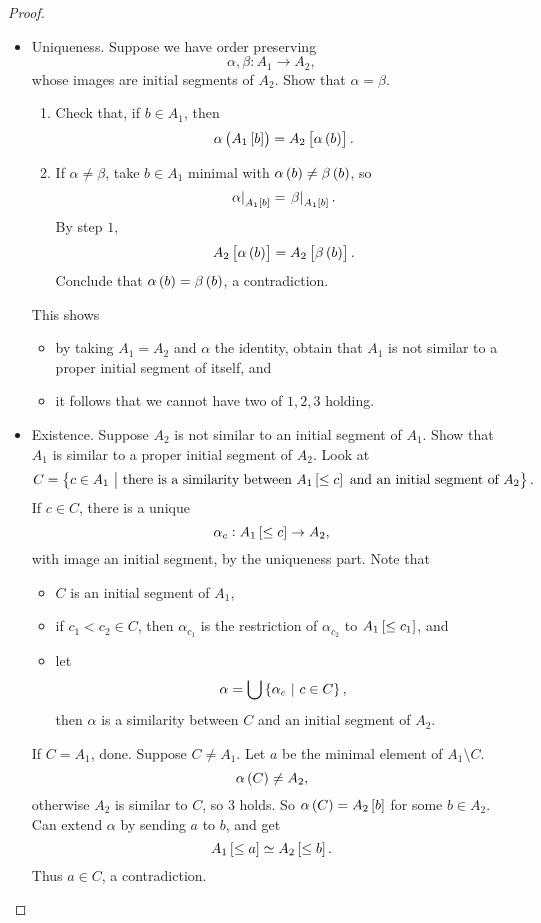 \begin{proof}
\hfill
\begin{itemize}
\item Uniqueness. Suppose we have order preserving
$$ \alpha, \beta : A_1 \to A_2, $$
whose images are initial segments of $ A_2 $. Show that $ \alpha = \beta $.
\begin{enumerate}[leftmargin=0.5in, label=Step \arabic*.]
\item Check that, if $ b \in A_1 $, then
$$ \alpha\br{A_1\sbr{b}} = A_2\sbr{\alpha\br{b}}. $$
\item If $ \alpha \ne \beta $, take $ b \in A_1 $ minimal with $ \alpha\br{b} \ne \beta\br{b} $, so
$$ \eval{\alpha}_{A_1\sbr{b}} = \eval{\beta}_{A_1\sbr{b}}. $$
By step $ 1 $,
$$ A_2\sbr{\alpha\br{b}} = A_2\sbr{\beta\br{b}}. $$
Conclude that $ \alpha\br{b} = \beta\br{b} $, a contradiction.
\end{enumerate}
This shows
\begin{itemize}
\item by taking $ A_1 = A_2 $ and $ \alpha $ the identity, obtain that $ A_1 $ is not similar to a proper initial segment of itself, and
\item it follows that we cannot have two of $ 1, 2, 3 $ holding.
\end{itemize}
\item Existence. Suppose $ A_2 $ is not similar to an initial segment of $ A_1 $. Show that $ A_1 $ is similar to a proper initial segment of $ A_2 $. Look at
$$ C = \cbr{c \in A_1 \st \text{there is a similarity between} \ A_1\sbr{\le c} \ \text{and an initial segment of} \ A_2}. $$
If $ c \in C $, there is a unique
$$ \alpha_c : A_1\sbr{\le c} \to A_2, $$
with image an initial segment, by the uniqueness part. Note that
\begin{itemize}
\item $ C $ is an initial segment of $ A_1 $,
\item if $ c_1 < c_2 \in C $, then $ \alpha_{c_1} $ is the restriction of $ \alpha_{c_2} $ to $ A_1\sbr{\le c_1} $, and
\item let
$$ \alpha = \bigcup \cbr{\alpha_c \st c \in C}, $$
then $ \alpha $ is a similarity between $ C $ and an initial segment of $ A_2 $.
\end{itemize}
If $ C = A_1 $, done. Suppose $ C \ne A_1 $. Let $ a $ be the minimal element of $ A_1 \setminus C $.
$$ \alpha\br{C} \ne A_2, $$
otherwise $ A_2 $ is similar to $ C $, so $ 3 $ holds. So $ \alpha\br{C} = A_2\sbr{b} $ for some $ b \in A_2 $. Can extend $ \alpha $ by sending $ a $ to $ b $, and get
$$ A_1\sbr{\le a} \simeq A_2\sbr{\le b}. $$
Thus $ a \in C $, a contradiction.
\end{itemize}
\end{proof}

